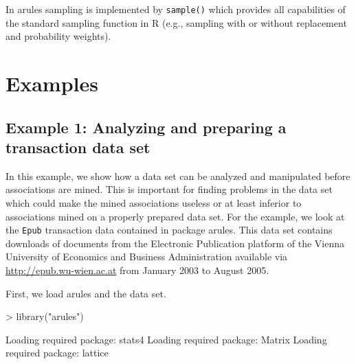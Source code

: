 \documentclass[10pt,a4paper]{article}
\newcommand{\strong}[1]{{\normalfont\fontseries{b}\selectfont #1}}
\newcommand{\func}[1]{\mbox{\texttt{#1()}}}
\newcommand{\code}[1]{\mbox{\texttt{#1}}}
\newcommand{\pkg}[1]{\strong{#1}}
\newcommand{\proglang}[1]{\textsf{#1}}
\begin{document}
In \pkg{arules} sampling is implemented by \func{sample}
which provides all capabilities of the standard sampling function 
in \proglang{R}
(e.g., sampling with or without replacement and probability weights).




\section{Examples\label{sec:examples}}

\subsection{Example 1: Analyzing and preparing a transaction 
data set \label{sec:example-screen}}

In this example, 
we show how a data set can be analyzed and manipulated
before associations are mined.
This is important for finding problems in the data set which 
could make the mined associations useless or at least inferior
to associations mined on a properly prepared data set.
For the example,
we look at the \code{Epub} transaction data contained in
package \pkg{arules}.  This data set contains downloads of documents
from the Electronic Publication platform of the Vienna University of
Economics and Business Administration available via
\url{http://epub.wu-wien.ac.at} from January 2003 to August 2005.

First, we load \pkg{arules} and the data set.

\begin{Schunk}
\begin{Sinput}
> library("arules")
\end{Sinput}
\begin{Soutput}
Loading required package: stats4
Loading required package: Matrix
Loading required package: lattice
\end{Soutput}
\end{Schunk}
\end{document}
